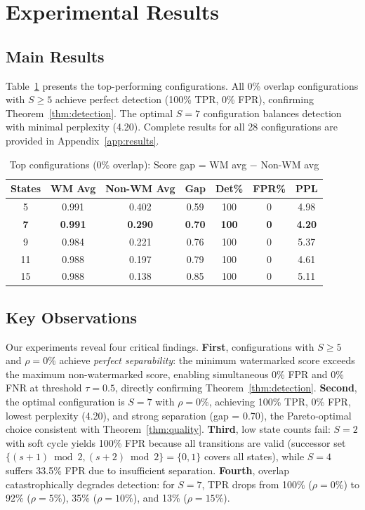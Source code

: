 \documentclass[11pt]{article}
\theoremstyle{definition}
\theoremstyle{remark}
\begin{document}
\section{Experimental Results}

\subsection{Main Results}

Table~\ref{tab:top_configs} presents the top-performing configurations. All 0\% overlap configurations with $S \geq 5$ achieve perfect detection (100\% TPR, 0\% FPR), confirming Theorem~\ref{thm:detection}. The optimal $S = 7$ configuration balances detection with minimal perplexity (4.20). Complete results for all 28 configurations are provided in Appendix~\ref{app:results}.

\begin{table}[H]
    \centering
    \caption{Top configurations (0\% overlap): Score gap = WM avg $-$ Non-WM avg}
    \label{tab:top_configs}
    \begin{tabular}{@{}ccccccc@{}}
        \toprule
        \textbf{States} & \textbf{WM Avg} & \textbf{Non-WM Avg} & \textbf{Gap} & \textbf{Det\%} & \textbf{FPR\%} & \textbf{PPL} \\
        \midrule
        5 & 0.991 & 0.402 & 0.59 & 100 & 0 & 4.98 \\
        \textbf{7} & \textbf{0.991} & \textbf{0.290} & \textbf{0.70} & \textbf{100} & \textbf{0} & \textbf{4.20} \\
        9 & 0.984 & 0.221 & 0.76 & 100 & 0 & 5.37 \\
        11 & 0.988 & 0.197 & 0.79 & 100 & 0 & 4.61 \\
        15 & 0.988 & 0.138 & 0.85 & 100 & 0 & 5.11 \\
        \bottomrule
    \end{tabular}
\end{table}

\subsection{Key Observations}

Our experiments reveal four critical findings. \textbf{First}, configurations with $S \geq 5$ and $\rho = 0\%$ achieve \textit{perfect separability}: the minimum watermarked score exceeds the maximum non-watermarked score, enabling simultaneous 0\% FPR and 0\% FNR at threshold $\tau = 0.5$, directly confirming Theorem~\ref{thm:detection}. \textbf{Second}, the optimal configuration is $S = 7$ with $\rho = 0\%$, achieving 100\% TPR, 0\% FPR, lowest perplexity (4.20), and strong separation (gap = 0.70), the Pareto-optimal choice consistent with Theorem~\ref{thm:quality}. \textbf{Third}, low state counts fail: $S = 2$ with soft cycle yields 100\% FPR because all transitions are valid (successor set $\{(s{+}1) \bmod 2, (s{+}2) \bmod 2\} = \{0,1\}$ covers all states), while $S = 4$ suffers 33.5\% FPR due to insufficient separation. \textbf{Fourth}, overlap catastrophically degrades detection: for $S = 7$, TPR drops from 100\% ($\rho = 0\%$) to 92\% ($\rho = 5\%$), 35\% ($\rho = 10\%$), and 13\% ($\rho = 15\%$).
\end{document}
